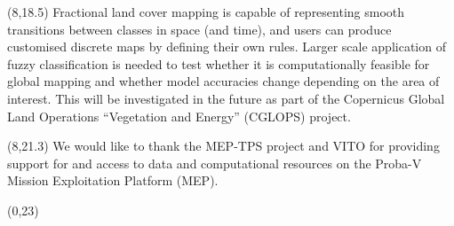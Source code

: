 \documentclass[20pt]{beamer}
\begin{document}
\begin{frame}{}
\begin{textblock}{7}

	\end{textblock}

	\begin{textblock}{7}(8,18.5)
		\Line
		Fractional land cover mapping is capable of representing smooth transitions between classes in space (and time), and users can produce customised discrete maps by defining their own rules. Larger scale application of fuzzy classification is needed to test whether it is computationally feasible for global mapping and whether model accuracies change depending on the area of interest. This will be investigated in the future as part of the Copernicus Global Land Operations ``Vegetation and Energy'' (CGLOPS) project.
		
	\end{textblock}
	
	\begin{textblock}{7}(8,21.3)
		\Line
		We would like to thank the MEP-TPS project and VITO for providing support for and access to data and computational resources on the Proba-V Mission Exploitation Platform (MEP).
		
	\end{textblock}
	

	\begin{textblock}{15}(0,23)
		\Line
	\end{textblock}	
	

\end{frame}
\end{document}
